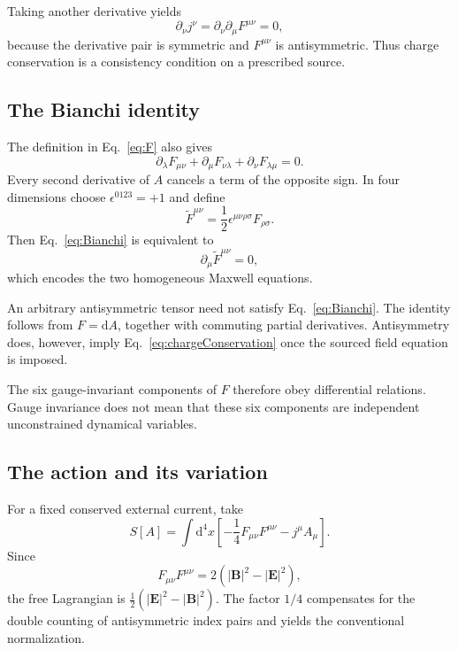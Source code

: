 \documentclass[11pt]{article}
\newcommand{\dd}{\mathrm{d}}
\begin{document}
Taking another derivative yields
\begin{equation}
\partial_\nu j^\nu
=\partial_\nu\partial_\mu F^{\mu\nu}=0,
\label{eq:chargeConservation}
\end{equation}
because the derivative pair is symmetric and \(F^{\mu\nu}\) is
antisymmetric. Thus charge conservation is a consistency condition on a
prescribed source.

\subsection{The Bianchi identity}

The definition in Eq.~\eqref{eq:F} also gives
\begin{equation}
\partial_\lambda F_{\mu\nu}
+\partial_\mu F_{\nu\lambda}
+\partial_\nu F_{\lambda\mu}=0.
\label{eq:Bianchi}
\end{equation}
Every second derivative of \(A\) cancels a term of the opposite sign. In four
dimensions choose \(\epsilon^{0123}=+1\) and define
\begin{equation}
\widetilde F^{\mu\nu}
=\frac12\epsilon^{\mu\nu\rho\sigma}F_{\rho\sigma}.
\end{equation}
Then Eq.~\eqref{eq:Bianchi} is equivalent to
\begin{equation}
\partial_\mu\widetilde F^{\mu\nu}=0,
\end{equation}
which encodes the two homogeneous Maxwell equations.

\begin{warningbox}
An arbitrary antisymmetric tensor need not satisfy
Eq.~\eqref{eq:Bianchi}. The identity follows from \(F=\dd A\), together
with commuting partial derivatives. Antisymmetry does, however, imply
Eq.~\eqref{eq:chargeConservation} once the sourced field equation is imposed.
\end{warningbox}
The six gauge-invariant components of \(F\) therefore obey differential
relations. Gauge invariance does not mean that these six components are
independent unconstrained dynamical variables.

\subsection{The action and its variation}

For a fixed conserved external current, take
\begin{equation}
\boxed{S[A]=\int\dd^4x\left[-\frac14F_{\mu\nu}F^{\mu\nu}
-j^\mu A_\mu\right].}
\label{eq:MaxwellAction}
\end{equation}
Since
\begin{equation}
F_{\mu\nu}F^{\mu\nu}=2(|\bm B|^2-|\bm E|^2),
\end{equation}
the free Lagrangian is \(\tfrac12(|\bm E|^2-|\bm B|^2)\).
The factor \(1/4\) compensates for the double counting of antisymmetric
index pairs and yields the conventional normalization.
\end{document}
